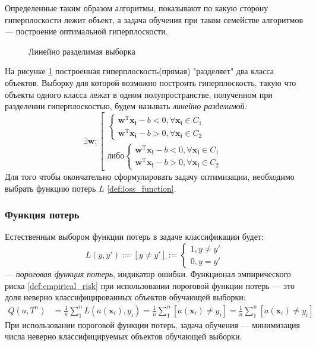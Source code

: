 \documentclass[%
bachelor,    %
subf,        %
href,        %
colorlinks,  %
]{disser}
\let\vec=\mathbf
\begin{document}
Определенные таким образом алгоритмы, показывают по какую сторону гиперплоскости лежит объект, а задача обучения при таком семействе алгоритмов --- построение оптимальной гиперплоскости.\\
\begin{figure}
	
	\caption{Линейно разделимая выборка}
	\label{fig:example1}
\end{figure}
На рисунке \ref{fig:example1} построенная гиперплоскость(прямая) "разделяет" два класса объектов. Выборку для которой возможно построить гиперплоскость, такую что объекты одного класса лежат в одном полупространстве, полученном при разделении гиперплоскостью, будем называть \textit{линейно разделимой:}
\begin{equation*}
\exists \vec{w}:
\left[ 
\begin{gathered}
\begin{cases}
\vec{w}^\mathrm{T}\vec{x_i} - b < 0, \forall \vec{x_i} \in C_1
\\
\vec{w}^\mathrm{T}\vec{x_i} - b > 0, \forall \vec{x_i} \in C_2
\end{cases}\\
либо
\begin{cases}
\vec{w}^\mathrm{T}\vec{x_i} - b < 0, \forall \vec{x_i} \in C_1
\\
\vec{w}^\mathrm{T}\vec{x_i} - b > 0, \forall \vec{x_i} \in C_2
\end{cases}
\end{gathered}
\right.
\end{equation*}
Для того чтобы окончательно сформулировать задачу оптимизации, необходимо выбрать функцию потерь $L$ \eqref{def:loss_function}.

\subsubsection{Функция потерь}
Естественным выбором функции потерь в задаче классификации будет:
\begin{equation}\label{def:indicator_loss_function}
L(y,y'):=[y \neq y'] :=
\begin{cases}
1, y \neq y'
\\
0, y=y'
\end{cases} 
\end{equation}
--- \textit{пороговая функция потерь}, индикатор ошибки. 
Функционал эмпирического риска \eqref{def:empirical_risk} при использовании пороговой функции потерь --- это доля неверно классифицированных объектов обучающей выборки:
\begin{equation}
\begin{aligned}
Q(a,T^n) &= \frac{1}{n} \sum_{1}^{n}L(a(\vec{x}_i),y_i)
=\frac{1}{n} \sum_{1}^{n} [a(\vec{x}_i) \ne y_i] 
=\frac{1}{n} \sum_{1}^{n} [a(\vec{x}_i) \ne y_i]
\end{aligned}
\end{equation}
При использовании пороговой функции потерь, задача обучения --- минимизация числа неверно классифицируемых объектов обучающей выборки.
\end{document}
